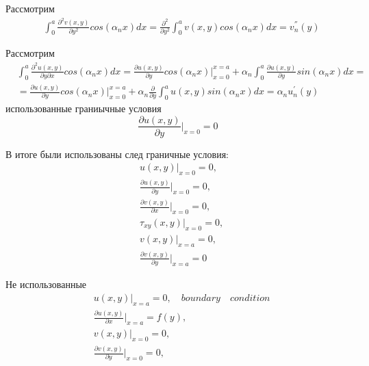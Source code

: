 Рассмотрим
\begin{align*}
    &\int_{0}^{a} \frac{\partial^2 v(x,y)}{\partial y^2} cos(\alpha_n x)dx = \frac{\partial^2}{\partial y^2} \int_{0}^{a} v(x,y) cos(\alpha_n x)dx = v_n^{''}(y)
\end{align*}

Рассмотрим
\begin{align*}
    &\int_{0}^{a} \frac{\partial^2 u(x,y)}{\partial y \partial x} cos(\alpha_n x)dx = \frac{\partial u(x,y)}{\partial y} cos(\alpha_n x) |_{x=0}^{x=a} + \alpha_n \int_{0}^{a} \frac{\partial u(x,y)}{\partial y} sin(\alpha_n x) dx = \\
    &=\frac{\partial u(x,y)}{\partial y} cos(\alpha_n x) |_{x=0}^{x=a} + \alpha_n \frac{\partial}{\partial y} \int_{0}^{a} u(x,y) sin(\alpha_n x) dx = \alpha_n u_n^{'}(y)
\end{align*}
использованные граниычные условия
\begin{equation*}
    \frac{\partial u(x,y)}{\partial y}|_{x=0} = 0
\end{equation*}

В итоге были использованы след граничные условия:
\begin{align*}
    &u(x,y)|_{x=0} = 0, \\
    &\frac{\partial u(x,y)}{\partial y}|_{x=0} = 0, \\
    &\frac{\partial v(x,y)}{\partial x}|_{x=0} = 0, \\
    &\tau_{xy}(x,y) |_{x=0} =0, \\
    &v(x, y)|_{x=a} = 0, \\
    &\frac{\partial v(x,y)}{\partial y}|_{x=a} = 0
\end{align*}

Не использованные
\begin{align*}
    &u(x,y)|_{x=a} = 0, \quad boundary \quad condition \\
    &\frac{\partial u(x,y)}{\partial x}|_{x=a} = f(y), \\
    &v(x,y)|_{x=0} = 0, \\
    &\frac{\partial v(x,y)}{\partial y}|_{x=0} = 0, \\
\end{align*}

